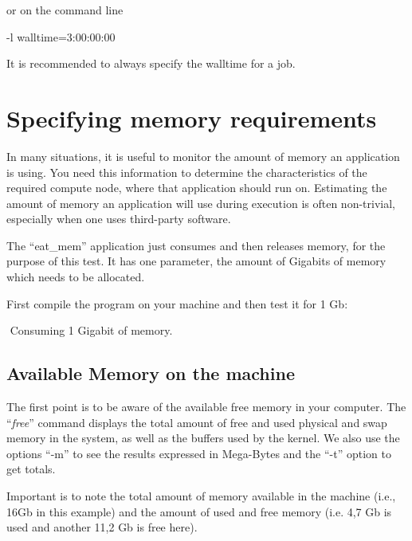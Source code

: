 or on the command line
\begin{prog}
-l walltime=3:00:00:00
\end{prog}

It is recommended to always specify the walltime for a job.

\section{Specifying memory requirements}

In many situations, it is useful to monitor the amount of memory an application is using. You need this information to determine the characteristics of the required compute node, where that application should run on.  Estimating the amount of memory an application will use during execution is often non-trivial, especially when one uses third-party software.

The ``eat\_mem'' application just consumes and then releases memory, for the purpose of this test. It has one parameter, the amount of Gigabits of memory which needs to be allocated.

First compile the program on your machine and then test it for 1 Gb:
\begin{prompt}
$ %
$ %
Consuming 1 Gigabit of memory.
\end{prompt}


\subsection{Available Memory on the machine}

The first point is to be aware of the available free memory in your computer. The ``\textit{free}'' command displays the total amount of free and used physical and swap memory in the system, as well as the buffers used by the kernel. We also use the options ``-m'' to see the results expressed in Mega-Bytes and the ``-t'' option to get totals.

Important is to note the total amount of memory available in the machine (i.e.,  16Gb in this example) and the amount of used and free memory (i.e. 4,7 Gb is used and another 11,2 Gb is free here).

